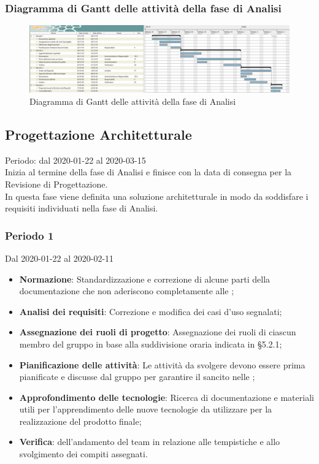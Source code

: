 \newpage
\begin{landscape}
\subsubsection{Diagramma di Gantt delle attività della fase di Analisi}
\pagestyle{empty}
\begin{figure}[h]
	\centering	
	\includegraphics[scale=0.455]{Sezioni/DiagrammiGantt/Analisi.png}
	\caption{Diagramma di Gantt delle attività della fase di Analisi}
\end{figure}
\end{landscape}
\clearpage

\subsection{Progettazione Architetturale}
Periodo: dal 2020-01-22 al 2020-03-15\\
Inizia al termine della fase di Analisi e finisce con la data di consegna per la Revisione di Progettazione.\\
In questa fase viene definita una soluzione architetturale in modo da soddisfare i requisiti individuati nella fase di Analisi.

\subsubsection{Periodo 1} 
Dal 2020-01-22 al 2020-02-11
\begin{itemize}
	\item \textbf{Normazione}: Standardizzazione e correzione di alcune parti della documentazione che non aderiscono completamente alle \NdP{};
	\item \textbf{Analisi dei requisiti}: Correzione e modifica dei casi d'uso segnalati;
	\item \textbf{Assegnazione dei ruoli di progetto}: Assegnazione dei ruoli di ciascun membro del gruppo in base alla suddivisione oraria indicata in §5.2.1;
	\item \textbf{Pianificazione delle attività}: Le attività da svolgere devono essere prima pianificate e discusse dal gruppo per garantire il  sancito nelle \NdP{};
	\item \textbf{Approfondimento delle tecnologie}: Ricerca di documentazione e materiali utili per l'apprendimento delle nuove tecnologie da utilizzare per la realizzazione del prodotto finale;
	\item \textbf{Verifica}:  dell'andamento del team in relazione alle tempistiche e allo svolgimento dei compiti assegnati.
\end{itemize}

